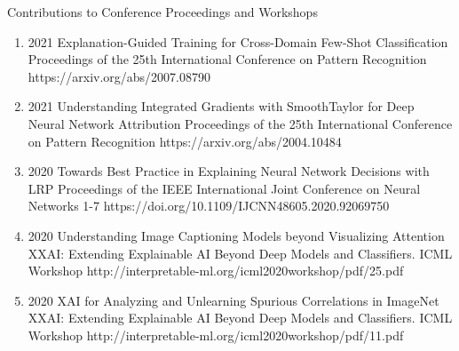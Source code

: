 \documentclass[10pt,a4paper]{article} %
\begin{document}
\headedsection %
{Contributions to Conference Proceedings and Workshops}{}
{
    \begin{enumerate}

        \item[] 
                                {2021}
                                {Explanation-Guided Training for Cross-Domain Few-Shot Classification}
                                {Proceedings of the 25th International Conference on Pattern Recognition}
                                {}
                                {https://arxiv.org/abs/2007.08790}

        \item[] 
                                {2021}
                                {Understanding Integrated Gradients with SmoothTaylor for Deep Neural Network Attribution}
                                {Proceedings of the 25th International Conference on Pattern Recognition}
                                {}
                                {https://arxiv.org/abs/2004.10484}

        \item[] 
                                {2020}
                                {Towards Best Practice in Explaining Neural Network Decisions with LRP}
                                {Proceedings of the IEEE International Joint Conference on Neural Networks}
                                {1-7}
                                {https://doi.org/10.1109/IJCNN48605.2020.92069750}

        \item[] 
                                {2020}
                                {Understanding Image Captioning Models beyond Visualizing Attention}
                                {XXAI: Extending Explainable AI Beyond Deep Models and Classifiers. ICML Workshop}
                                {}
                                {http://interpretable-ml.org/icml2020workshop/pdf/25.pdf}


        \item[] 
                                {2020}
                                {XAI for Analyzing and Unlearning Spurious Correlations in ImageNet}
                                {XXAI: Extending Explainable AI Beyond Deep Models and Classifiers. ICML Workshop}
                                {}
                                {http://interpretable-ml.org/icml2020workshop/pdf/11.pdf}



\end{enumerate}}
\end{document}
